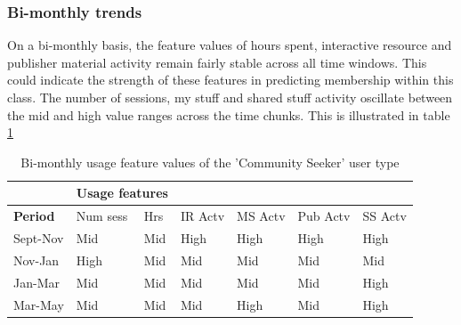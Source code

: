\documentclass{acm_proc_article-sp}
\begin{document}
\subsubsection{Bi-monthly trends}
On a bi-monthly basis, the feature values of hours spent, interactive resource and publisher material activity remain fairly stable across all time windows. This could indicate the strength of these features in predicting membership within this class. The number of sessions, my stuff and shared stuff activity oscillate between the mid and high value ranges across the time chunks. This is illustrated in table \ref{cluster2bimonthly} 
\begin{table}
\caption{Bi-monthly usage feature values of the 'Community Seeker' user type}
\label{cluster2bimonthly}
\begin{tabular}{|p{1.5cm}|p{0.6cm}|p{0.6cm}|p{0.6cm}|p{0.6cm}|p{0.8cm}|p{0.8cm}|}
& \multicolumn{2}{r}{\textbf{Usage features}}  \\ \hline
 \textbf{Period} 
 & Num sess & Hrs & IR Actv & MS Actv & Pub Actv & SS Actv \\ \hline
Sept-Nov & Mid & Mid  & High & High & High & High \\ \hline
Nov-Jan & High & Mid  & Mid & Mid & Mid & Mid \\ \hline
Jan-Mar & Mid & Mid  & Mid & Mid & Mid & High \\ \hline
Mar-May & Mid & Mid  & Mid & High & Mid & High \\ \hline
\end{tabular}
\end{table}
\end{document}
